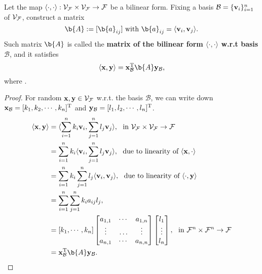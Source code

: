 \begin{proposition}
\label{matrix_of_bilinear_form}
Let the map $\langle \cdot, \cdot \rangle: \mathcal{V}_{\mathcal{F}} \times \mathcal{V}_{\mathcal{F}} \to {\mathcal{F}}$ be a bilinear form.
Fixing a basis $\mathcal{B} = \{ \mathbf{v}_i \}_{i=1}^n$ of $\mathcal{V}_{\mathcal{F}}$, 
construct a matrix 
%
\begin{equation*}
    \b{A} := [\b{a}_{ij}] \textnormal{  with  } \b{a}_{ij} = \langle \vv_i, \vv_j \rangle.
\end{equation*}
%
Such matrix $\b{A}$ is called the \textbf{matrix of the bilinear form $\langle \cdot, \cdot \rangle$ w.r.t basis $\mathcal{B}$}, and it satisfies
%
\begin{equation*}
 \langle \x, \y \rangle = \x^\T_{\mathcal{B}} \b{A} \y_{\mathcal{B}},
\end{equation*}
%
where .
\end{proposition}
%
\begin{proof}
For random $\mathbf{x},\mathbf{y} \in \mathcal{V}_{\mathcal{F}}$ w.r.t. the basis $\mathcal{B}$, we can write down
$\mathbf{x}_{\mathcal{B}} = [k_1,k_2, \cdots, k_n]^{\mathrm{T}}$ and 
$\mathbf{y}_{\mathcal{B}} = [l_1,l_2, \cdots, l_n]^{\mathrm{T}}$.
\begin{align*}
    \langle \x, \y \rangle
    &= \langle \sum_{i=1}^n k_i \vv_i, \sum_{j=1}^n l_j \vv_j \rangle, \ \textnormal{ in } \VF \times \VF \to \F\\
    &= \sum_{i=1}^n k_i \langle \vv_i, \sum_{j=1}^n l_j \vv_j \rangle, \ \textnormal{ due to linearity of }  \langle \x, \cdot \rangle \\
    &= \sum_{i=1}^n k_i \sum_{j=1}^n l_j \langle \vv_i, \vv_j \rangle, \ \textnormal{ due to linearity of }  \langle \cdot, \y \rangle \\
    &= \sum_{i=1}^n \sum_{j=1}^n k_i a_{ij} l_j,\\
    &= [k_1, \cdots, k_n] 
   \begin{bmatrix}
    a_{1,1} &\cdots &a_{1,n}\\
    \vdots  &\ldots &\vdots\\
    a_{n,1} &\cdots &a_{n,n}
   \end{bmatrix}
   \begin{bmatrix}
   l_1\\
   \vdots\\
   l_n
   \end{bmatrix}, \ \textnormal{ in } \F^n \times \F^n \to \F \\
    &= \x^\T_{\mathcal{B}} \b{A} \y_{\mathcal{B}}.
\end{align*}
%
\end{proof}


